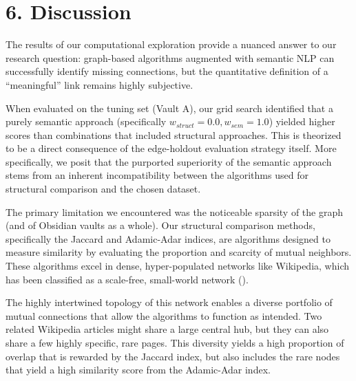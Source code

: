 \documentclass[fontsize=11pt]{article}
\begin{document}
\section*{6. Discussion}

The results of our computational exploration provide a nuanced answer to our research question: graph-based algorithms augmented with semantic NLP can successfully identify missing connections, but the quantitative definition of a \enquote{meaningful} link remains highly subjective.

When evaluated on the tuning set (Vault A), our grid search identified that a purely semantic approach (specifically $w_{struct}=0.0, w_{sem}=1.0$) yielded higher scores than combinations that included structural approaches. This is theorized to be a direct consequence of the edge-holdout evaluation strategy itself. More specifically, we posit that the purported superiority of the semantic approach stems from an inherent incompatibility between the algorithms used for structural comparison and the chosen dataset.

The primary limitation we encountered was the noticeable sparsity of the graph (and of Obsidian vaults as a whole). Our structural comparison methods, specifically the Jaccard and Adamic-Adar indices, are algorithms designed to measure similarity by evaluating the proportion and scarcity of mutual neighbors. These algorithms excel in dense, hyper-populated networks like Wikipedia, which has been classified as a scale-free, small-world network (\cite{masucci2011wikipedia, capocci2006wikipedia}).

The highly intertwined topology of this network enables a diverse portfolio of mutual connections that allow the algorithms to function as intended. Two related Wikipedia articles might share a large central hub, but they can also share a few highly specific, rare pages. This diversity yields a high proportion of overlap that is rewarded by the Jaccard index, but also includes the rare nodes that yield a high similarity score from the Adamic-Adar index.
\end{document}
